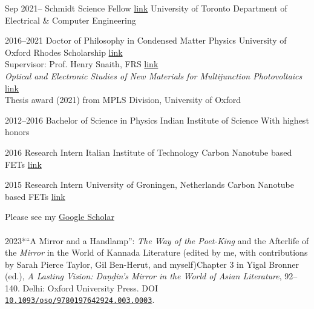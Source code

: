\documentclass{scrartcl}
\begin{document}
\begin{entrylist}
\entry
{Sep 2021–}
{Schmidt Science Fellow \textnormal{\href{https://schmidtsciencefellows.org/fellow/suhas-mahesh/}{link}}}
{University of Toronto}
{Department of Electrical \& Computer Engineering}
\end{entrylist}


\begin{entrylist}
\entry
{2016--2021}
{Doctor of Philosophy in Condensed Matter Physics}
{University of Oxford}
{Rhodes Scholarship \href{https://www.rhodeshouse.ox.ac.uk/scholars/rhodes-scholars-class-of-2016/suhas-mahesh/}{link}\\
Supervisor: Prof. Henry Snaith, FRS \href{https://scholar.google.com/citations?user=I2D3pUMAAAAJ&hl=en}{link}\\
\emph{Optical and Electronic Studies of New Materials for Multijunction Photovoltaics }\href{http://dx.doi.org/10.5287/bodleian:mNArOK77N}{link}\\
Thesis award (2021) from MPLS Division, University of Oxford \\
}

\entry
{2012--2016}
{Bachelor of Science in Physics}
{Indian Institute of Science}
{With highest honors}

\entry
{2016}
{Research Intern}
{Italian Institute of Technology}
{Carbon Nanotube based FETs \href{https://scholar.google.it/citations?user=f3suRUkAAAAJ&hl=en}{link}}

\entry
{2015}
{Research Intern}
{University of Groningen, Netherlands}
{Carbon Nanotube based FETs \href{https://scholar.google.com/citations?user=Cw22GB8AAAAJ&hl=en}{link}}
\end{entrylist}\bigskip\bigskip


\begin{entrylist}

 Please see my \href{https://scholar.google.com/citations?user=Y5ReiQsAAAAJ&hl=en}{Google Scholar}\\\\

{2023}{*“A Mirror and a Handlamp”: \emph{The Way of the Poet-King} and the Afterlife of the \emph{Mirror} in the World of Kannada Literature (edited by me, with contributions by Sarah Pierce Taylor, Gil Ben-Herut, and myself)}{Chapter 3 in Yigal Bronner (ed.), \emph{A Lasting Vision: Daṇḍin’s Mirror in the World of Asian Literature}, 92–140. Delhi: Oxford University Press. DOI \href{https://doi.org/10.1093/oso/9780197642924.003.0003}{\texttt{10.1093/oso/9780197642924.003.0003}}.}
\end{entrylist}\bigskip
\end{document}
